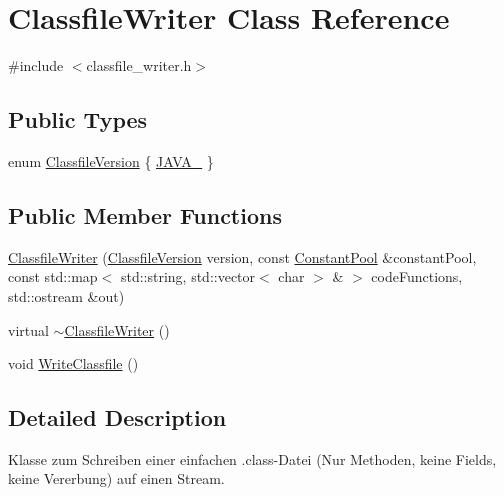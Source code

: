\hypertarget{classClassfileWriter}{\section{Classfile\-Writer Class Reference}
\label{classClassfileWriter}
}


{\ttfamily \#include $<$classfile\-\_\-writer.\-h$>$}

\subsection*{Public Types}
\begin{DoxyCompactItemize}
\item 
enum \hyperlink{classClassfileWriter_ad1f8ad574818eb3e851f3c99ba6cc8f2}{Classfile\-Version} \{ \hyperlink{classClassfileWriter_ad1f8ad574818eb3e851f3c99ba6cc8f2af3b45f7e6d21c22615772ad808043633}{J\-A\-V\-A\-\_}
 \}
\end{DoxyCompactItemize}
\subsection*{Public Member Functions}
\begin{DoxyCompactItemize}
\item 
\hyperlink{classClassfileWriter_afbc090a3af8847ec859093e33ddd28e8}{Classfile\-Writer} (\hyperlink{classClassfileWriter_ad1f8ad574818eb3e851f3c99ba6cc8f2}{Classfile\-Version} version, const \hyperlink{classConstantPool}{Constant\-Pool} \&constant\-Pool, const std\-::map$<$ std\-::string, std\-::vector$<$ char $>$ \& $>$ code\-Functions, std\-::ostream \&out)
\item 
virtual \hyperlink{classClassfileWriter_ab72a8243f08eb03cbfdd517121d2f1d2}{$\sim$\-Classfile\-Writer} ()
\item 
void \hyperlink{classClassfileWriter_a578ae6492320adc125ec2aaf13ad65c6}{Write\-Classfile} ()
\end{DoxyCompactItemize}


\subsection{Detailed Description}
Klasse zum Schreiben einer einfachen .class-\/\-Datei (Nur Methoden, keine Fields, keine Vererbung) auf einen Stream. 


